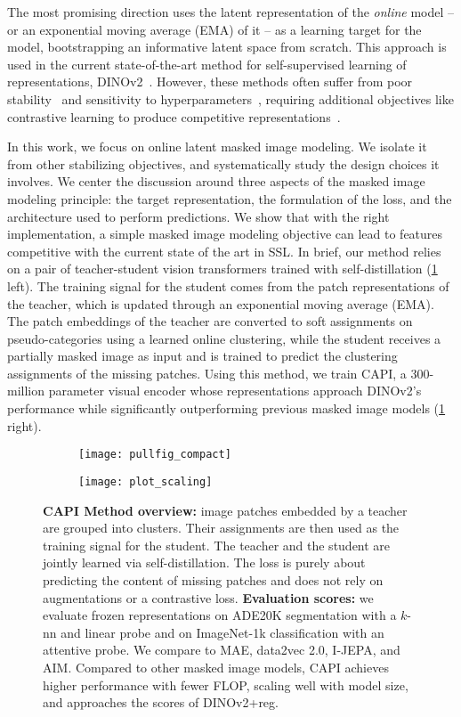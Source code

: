 The most promising direction uses the latent representation of the \emph{online} model -- or an exponential moving average (EMA) of it -- as a learning target for the model, bootstrapping an informative latent space from scratch.
This approach is used in the current state-of-the-art method for self-supervised learning of representations, DINOv2~\citep{dinov2}.
However, these methods often suffer from poor stability~\citep{ibot} and sensitivity to hyperparameters~\citep{ijepa}, requiring additional objectives like contrastive learning to produce competitive representations~\citep{ibot,dinov2,mimrefiner}.

In this work, we focus on online latent masked image modeling.
We isolate it from other stabilizing objectives, and systematically study the design choices it involves.
We center the discussion around three aspects of the masked image modeling principle: the target representation, the formulation of the loss, and the architecture used to perform predictions.
We show that with the right implementation, a simple masked image modeling objective can lead to features competitive with the current state of the art in SSL.
In brief, our method relies on a pair of teacher-student vision transformers trained with self-distillation (\cref{fig:pullfig} left).
The training signal for the student comes from the patch representations of the teacher, which is updated through an exponential moving average (EMA).
The patch embeddings of the teacher are converted to soft assignments on pseudo-categories using a learned online clustering, while the student receives a partially masked image as input and is trained to predict the clustering assignments of the missing patches.
Using this method, we train CAPI, a 300-million parameter visual encoder whose representations approach DINOv2's performance while significantly outperforming previous masked image models (\cref{fig:pullfig} right).

\begin{figure}[t]
  \centering
  \hfill
  \begin{subfigure}{.32\textwidth}
    \texttt{[image: pullfig\_compact]}
  \end{subfigure}
  \hfill
  \begin{subfigure}{.64\textwidth}
    \centering
    \texttt{[image: plot\_scaling]}
  \end{subfigure}
  \hfill
  \caption{
    \textbf{CAPI Method overview:}
    image patches embedded by a teacher are grouped into clusters.
    Their assignments are then used as the training signal for the student.
    The teacher and the student are jointly learned via self-distillation.
    The loss is purely about predicting the content of missing patches and does not rely on augmentations or a contrastive loss.
    \textbf{Evaluation scores:}
    we evaluate frozen representations on ADE20K segmentation with a $k$-nn and linear probe and on ImageNet-1k classification with an attentive probe.
    We compare to MAE, data2vec 2.0, I-JEPA, and AIM.
    Compared to other masked image models, CAPI achieves higher performance with fewer FLOP, scaling well with model size, and approaches the scores of DINOv2+reg.
    }
  \label{fig:pullfig}
\end{figure}


